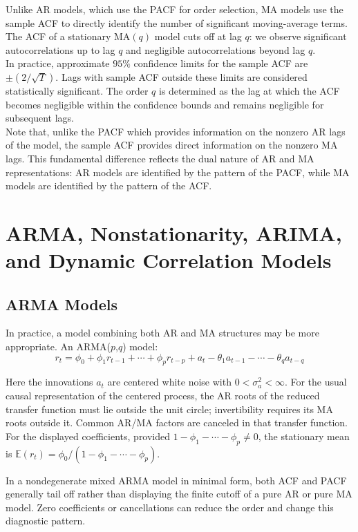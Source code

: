 Unlike AR models, which use the PACF for order selection, MA models use the sample ACF to directly identify the number of significant moving-average terms. The ACF of a stationary MA$(q)$ model cuts off at lag $q$: we observe significant autocorrelations up to lag $q$ and negligible autocorrelations beyond lag $q$.\\
In practice, approximate $95\%$ confidence limits for the sample ACF are $\pm(2/\sqrt{T})$. Lags with sample ACF outside these limits are considered statistically significant. The order $q$ is determined as the lag at which the ACF becomes negligible within the confidence bounds and remains negligible for subsequent lags.\\
Note that, unlike the PACF which provides information on the nonzero AR lags of the model, the sample ACF provides direct information on the nonzero MA lags. This fundamental difference reflects the dual nature of AR and MA representations: AR models are identified by the pattern of the PACF, while MA models are identified by the pattern of the ACF.

\section{ARMA, Nonstationarity, ARIMA, and Dynamic Correlation Models}

\subsection{ARMA Models}

In practice, a model combining both AR and MA structures may be more appropriate. An ARMA($p$,$q$) model:
$$r_t = \phi_0 + \phi_1 r_{t-1} + \cdots + \phi_p r_{t-p} + a_t - \theta_1 a_{t-1} - \cdots - \theta_q a_{t-q}$$

Here the innovations $a_t$ are centered white noise with
$0<\sigma_a^2<\infty$. For the usual causal representation of the
centered process, the AR roots of the reduced transfer function must
lie outside the unit circle; invertibility requires its MA roots outside
it. Common AR/MA factors are canceled in that transfer function.
For the displayed coefficients, provided $1-\phi_1-\cdots-\phi_p\ne0$,
the stationary mean is $\mathbb E(r_t)=\phi_0/(1-\phi_1-\cdots-\phi_p)$.

In a nondegenerate mixed ARMA model in minimal form, both ACF and
PACF generally tail off rather than displaying the finite cutoff of a
pure AR or pure MA model. Zero coefficients or cancellations can reduce
the order and change this diagnostic pattern.

